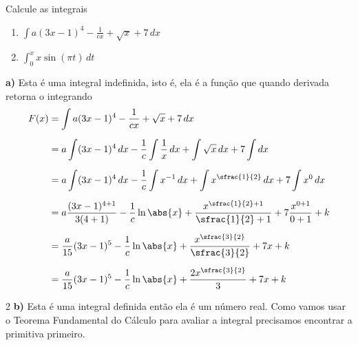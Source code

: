 \documentclass[a4paper,12pt,fleqn]{article}
\begin{document}

Calcule as integrais
\begin{enumerate}[label=\alph*),itemsep=0pt,topsep=0pt]
  \item\!\! [20\%] \(\int a(3x-1)^4 - \frac{1}{cx} + \sqrt{x} + 7 \, dx\)
  \item\!\! [20\%] \(\int_0^x x\sin(\pi t) \, dt \)
\end{enumerate}

\clearpagequestiononly

\begin{answer}
\textbf{a)} \quad
  Esta é uma integral indefinida, isto é, ela é a função que quando derivada
  retorna o integrando
  \begin{align*}
    F(x)
    & = \int a(3x-1)^4 - \frac{1}{cx} + \sqrt{x} + 7 \, dx
    \\[2mm]
    & = a\int (3x-1)^4 \, dx
      - \frac{1}{c}\int \frac{1}{x} \, dx
      + \int \sqrt{x} \, dx
      + 7 \int dx
    \\[2mm]
    & = a\int (3x-1)^4 \, dx
      - \frac{1}{c}\int x^{-1} \, dx
      + \int x^{\sfrac{1}{2}} \, dx
      + 7\int x^0 \, dx
    \\[2mm]
    & = a\frac{(3x-1)^{4+1}}{3(4+1)}
      - \frac{1}{c}\ln\abs{x}
      + \frac{x^{\sfrac{1}{2}+1}}{\sfrac{1}{2}+1}
      + 7\frac{x^{0+1}}{0+1} + k
      \\[2mm]
    & = \frac{a}{15} (3x-1)^5
      - \frac{1}{c}\ln\abs{x}
      + \frac{x^{\sfrac{3}{2}}}{\sfrac{3}{2}}
      + 7x + k
      \\[2mm]
    & = \frac{a}{15} (3x-1)^5
      - \frac{1}{c}\ln\abs{x}
      + \frac{2x^{\sfrac{3}{2}}}{3}
      + 7x + k
  \end{align*}

\begin{multicols}{2}
\textbf{b)} \quad
  Esta é uma integral definida então ela é um número real.
  Como vamos usar o Teorema Fundamental do Cálculo para avaliar a integral
  precisamos encontrar a primitiva primeiro.


\end{multicols}
\end{answer}
\end{document}
